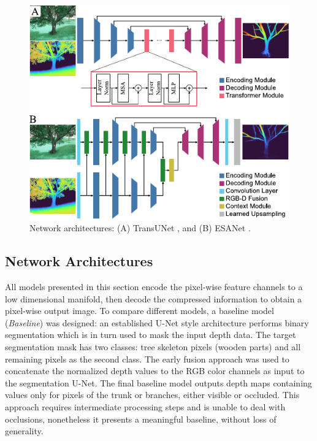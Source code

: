 \begin{figure}[!t]
\centering
\includegraphics[width=1\columnwidth]{figures/fig-2-networks/fig-2-networks-v02.pdf}
\vspace{\figurevspaceabove}
\caption{Network architectures: (A) TransUNet \cite{Chen2021c}, and (B) ESANet \cite{Seichter2021}.}
\label{fig-2-networks}
\vspace{\figurevspacebelow}
\end{figure}

\subsection{Network Architectures}
\label{sec:models}
All models presented in this section encode the pixel-wise feature channels to a low dimensional manifold, then decode the compressed information to obtain a pixel-wise output image. 
To compare different models, a baseline model (\textit{Baseline}) was designed: an established U-Net style architecture \cite{ronneberger2015u} performs binary segmentation which is in turn used to mask the input depth data. The target segmentation mask has two classes: tree skeleton pixels (wooden parts) and all remaining pixels as the second class. The early fusion approach was used to concatenate the normalized depth values to the RGB color channels as input to the segmentation U-Net. The final baseline model outputs depth maps containing values only for pixels of the trunk or branches, either visible or occluded. This approach requires intermediate processing steps and is unable to deal with occlusions, nonetheless it presents a meaningful baseline, without loss of generality.

